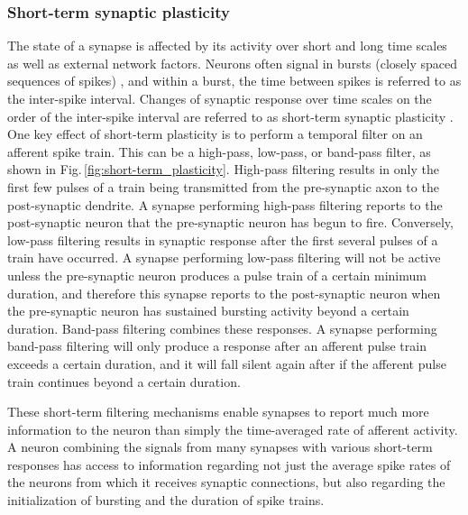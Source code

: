 \documentclass[twocolumn]{article}
\begin{document}
\subsubsection{Short-term synaptic plasticity}
The state of a synapse is affected by its activity over short and long time scales as well as external network factors. Neurons often signal in bursts (closely spaced sequences of spikes) \cite{iz2007}, and within a burst, the time between spikes is referred to as the inter-spike interval. Changes of synaptic response over time scales on the order of the inter-spike interval are referred to as short-term synaptic plasticity \cite{abre2004}. One key effect of short-term plasticity is to perform a temporal filter on an afferent spike train. This can be a high-pass, low-pass, or band-pass filter, as shown in Fig.\,\ref{fig:short-term_plasticity}. High-pass filtering results in only the first few pulses of a train being transmitted from the pre-synaptic axon to the post-synaptic dendrite. A synapse performing high-pass filtering reports to the post-synaptic neuron that the pre-synaptic neuron has begun to fire. Conversely, low-pass filtering results in synaptic response after the first several pulses of a train have occurred. A synapse performing low-pass filtering will not be active unless the pre-synaptic neuron produces a pulse train of a certain minimum duration, and therefore this synapse reports to the post-synaptic neuron when the pre-synaptic neuron has sustained bursting activity beyond a certain duration. Band-pass filtering combines these responses. A synapse performing band-pass filtering will only produce a response after an afferent pulse train exceeds a certain duration, and it will fall silent again after if the afferent pulse train continues beyond a certain duration.

These short-term filtering mechanisms enable synapses to report much more information to the neuron than simply the time-averaged rate of afferent activity. A neuron combining the signals from many synapses with various short-term responses has access to information regarding not just the average spike rates of the neurons from which it receives synaptic connections, but also regarding the initialization of bursting and the duration of spike trains.
\end{document}
